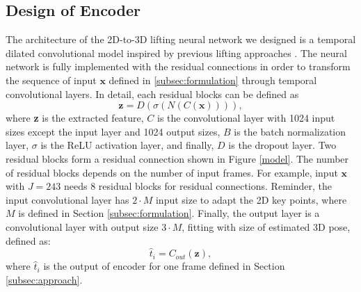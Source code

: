 \documentclass[runningheads]{llncs}
\begin{document}
\subsection{Design of Encoder}
The architecture of the 2D-to-3D lifting neural network we designed is a temporal dilated convolutional model inspired by previous lifting approaches \cite{MartinezHRL17,temporal_convolutions_and_semi_supervised}. The neural network is fully implemented with the residual connections \cite{ResNet_2016} in order to transform the sequence of input \(\textbf{x}\) defined in \ref{subsec:formulation} through temporal convolutional layers. 
In detail, each residual blocks can be defined as  
\begin{equation}
\textbf{z} = D(\sigma (N(C(\textbf{x})))),
\end{equation}
where \textbf{z} is the extracted feature, \(C\) is the convolutional layer with 1024 input sizes except the input layer and 1024 output sizes, \(B\) is the batch normalization layer, \(\sigma\) is the ReLU activation layer, and finally, \(D\) is the dropout layer. Two residual blocks form a residual connection shown in Figure \ref{model}. The number of residual blocks depends on the number of input frames. For example, input \(\textbf{x}\) with \(J = 243\) needs 8 residual blocks for residual connections. Reminder, the input convolutional layer has \(2 \cdot M\) input size to adapt the 2D key points, where \(M\) is defined in Section \ref{subsec:formulation}. Finally, the output layer is a convolutional layer with output size \(3 \cdot M\), fitting with size of estimated 3D pose, defined as:
\begin{equation}
\hat{t}_{i} = C_{out}(\textbf{z}),
\end{equation}
where \(\hat{t}_{i}\) is the output of encoder for one frame defined in Section \ref{subsec:approach}. 
\end{document}
